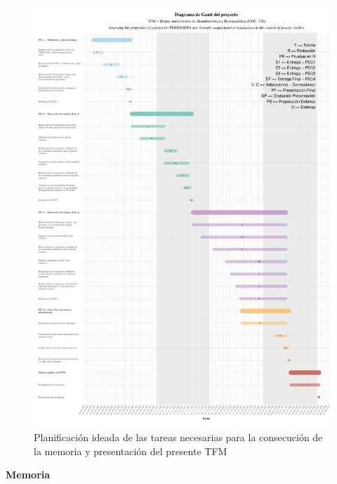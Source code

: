 \documentclass[IB,BIB]{TFUOC}%
\begin{document}
\begin{figure}[!htbp]
    \centering
    \includegraphics[scale=.5]{TFMGantt.pdf}
    \caption{\scriptsize{Planificación ideada de las tareas necesarias para la consecución de la memoria y presentación del presente TFM}}
    \label{fig:PEC3 - GANTT_TFM}
\end{figure}


\newpage\null\thispagestyle{empty} %

\Huge
\vfill

\textbf{Memoria}
\normalsize

\newpage




\end{document}
